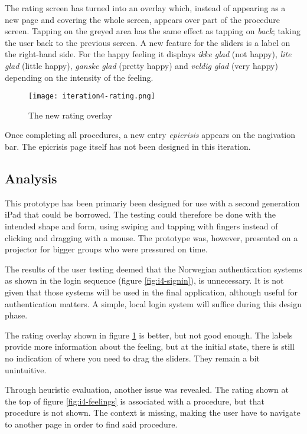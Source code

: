 The rating screen has turned into an overlay which, instead of appearing as a new page and covering the whole screen, appears over part of the procedure screen. Tapping on the greyed area has the same effect as tapping on \emph{back}; taking the user back to the previous screen. A new feature for the sliders is a label on the right-hand side. For the happy feeling it displays \emph{ikke glad} (not happy), \emph{lite glad} (little happy), \emph{ganske glad} (pretty happy) and \emph{veldig glad} (very happy) depending on the intensity of the feeling.

\begin{figure}
    \centering
    \texttt{[image: iteration4-rating.png]}
    \caption{The new rating overlay}
    \label{fig:i4-rating}
\end{figure}

Once completing all procedures, a new entry \emph{epicrisis} appears on the nagivation bar. The epicrisis page itself has not been designed in this iteration.

\subsection{Analysis}

This prototype has been primariy been designed for use with a second generation iPad that could be borrowed. The testing could therefore be done with the intended shape and form, using swiping and tapping with fingers instead of clicking and dragging with a mouse. The prototype was, however, presented on a projector for bigger groups who were pressured on time.

The results of the user testing deemed that the Norwegian authentication systems as shown in the login sequence (figure \ref{fig:i4-signin}), is unnecessary. It is not given that those systems will be used in the final application, although useful for authentication matters. A simple, local login system will suffice during this design phase.

The rating overlay shown in figure \ref{fig:i4-rating} is better, but not good enough. The labels provide more information about the feeling, but at the initial state, there is still no indication of where you need to drag the sliders. They remain a bit unintuitive.

Through heuristic evaluation, another issue was revealed. The rating shown at the top of figure \ref{fig:i4-feelings} is associated with a procedure, but that procedure is not shown. The context is missing, making the user have to navigate to another page in order to find said procedure.

